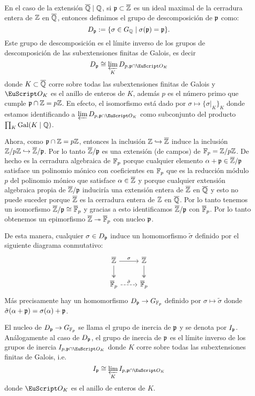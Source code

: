 \documentclass[../../tesis_maestria]{subfiles}
\begin{document}
En el caso de la extensi\'on $\overline{\mathbb{Q}}\mid\mathbb{Q}$, si $\mathfrak{p}\subset\overline{\mathbb{Z}}$ es un ideal maximal de la cerradura entera de $\mathbb{Z}$ en $\overline{\mathbb{Q}}$, entonces definimos el grupo de descomposici\'on de $\mathfrak{p}$ como:
\[
  D_{\mathfrak{p}}:=\{\sigma\in G_{\mathbb{Q}}\mid \sigma(\mathfrak{p})=\mathfrak{p}\}.
\]
Este grupo de descomposici\'on es el l\'imite inverso de los grupos de descomposici\'on de las subextensiones finitas de Galois, es decir
\[
  D_{\p}\cong \varprojlim_{K}D_{p,\p\cap\Oo_K}
\]
donde $K\subset\overline{\mathbb{Q}}$ corre sobre todas las subextensiones finitas de Galois y $\Oo_K$ es el anillo de enteros de $K$, adem\'as $p$ es el n\'umero primo que cumple $\mathfrak{p}\cap\mathbb{Z}=p\mathbb{Z}$. En efecto, el isomorfismo est\'a dado por $\sigma\mapsto \{\sigma|_K\}_{K}$ donde estamos identificando a $\varprojlim D_{p,\p\cap\Oo_K}$ como subconjunto del producto $\prod_K\text{Gal}(K\mid\mathbb{Q})$.

Ahora, como $\mathfrak{p}\cap\mathbb{Z}=p\mathbb{Z}$, entonces la inclusi\'on $\mathbb{Z}\hookrightarrow\overline{\mathbb{Z}}$ induce la inclusi\'on $\mathbb{Z}/p\mathbb{Z} \hookrightarrow\overline{\mathbb{Z}}/\mathfrak{p}$. Por lo tanto $\overline{\mathbb{Z}}/\mathfrak{p}$ es una extensi\'on (de campos) de $\mathbb{F}_p=\mathbb{Z}/p\mathbb{Z}$. De hecho es la cerradura algebraica de $\mathbb{F}_p$ porque cualquier elemento $\alpha+\mathfrak{p}\in\overline{\mathbb{Z}}/\mathfrak{p}$ satisface un polinomio m\'onico con coeficientes en $\mathbb{F}_p$ que es la reducci\'on m\'odulo $p$ del polinomio m\'onico que satisface $\alpha\in\overline{\mathbb{Z}}$ y porque cualquier extensi\'on algebraica propia de $\overline{\mathbb{Z}}/\mathfrak{p}$ inducir\'ia una extensi\'on entera de $\overline{\mathbb{Z}}$ en $\overline{\mathbb{Q}}$ y esto no puede suceder porque $\overline{\mathbb{Z}}$ es la cerradura entera de $\mathbb{Z}$ en $\overline{\mathbb{Q}}$. Por lo tanto tenemos un isomorfismo $\overline{\mathbb{Z}}/\mathfrak{p}\cong\overline{\mathbb{F}}_p$ y gracias a esto identificamos $\overline{\mathbb{Z}}/\mathfrak{p}$ con $\overline{\mathbb{F}}_p$. Por lo tanto obtenemos un epimorfismo $\overline{\mathbb{Z}}\twoheadrightarrow\overline{\mathbb{F}}_p$ con nucleo $\mathfrak{p}$.

De esta manera, cualquier $\sigma\in D_{\mathfrak{p}}$ induce un homomorfismo $\tilde{\sigma}$ definido por el siguiente diagrama conmutativo:
\[
  \begin{tikzcd}
    \ol{\ZZ} \arrow[d,two heads] \arrow[r,"\sigma"] & \ol{\ZZ} \arrow[d,two heads]\\
    \ol{\FF}_p \arrow[r,dashed,"\tilde{\sigma}"]& \ol{\FF}_p
  \end{tikzcd}
\]
M\'as precisamente hay un homomorfismo $D_{\mathfrak{p}}\rightarrow G_{\mathbb{F}_p}$ definido por $\sigma\mapsto\tilde{\sigma}$ donde $\tilde{\sigma}(\alpha+\mathfrak{p})=\sigma(\alpha)+\mathfrak{p}$.

El nucleo de $D_{\mathfrak{p}}\rightarrow G_{\mathbb{F}_p}$ se llama el grupo de inercia de $\mathfrak{p}$ y se denota por $I_{\mathfrak{p}}$. An\'alogamente al caso de $D_{\mathfrak{p}}$, el grupo de inercia de $\mathfrak{p}$ es el l\'imite inverso de los grupos de inercia $I_{p,\p\cap\Oo_K}$ donde $K$ corre sobre todas las subextensiones finitas de Galois, i.e.
\[
  I_{\p}\cong\varprojlim_K I_{p,\p\cap\Oo_K}
\]
donde $\Oo_K$ es el anillo de enteros de $K$.
\end{document}
